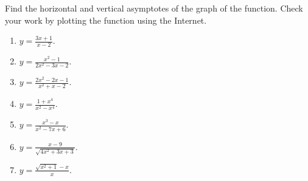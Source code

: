 Find the horizontal and vertical asymptotes of the graph of the function. Check your work by plotting the function using the Internet.
\begin{multicols}{2}
\begin{enumerate}
\item $\displaystyle y=\frac{3x+1}{x-2}$.

\item $\displaystyle y=\frac{x^2-1}{2x^2-3x-2}$.

\item $\displaystyle y=\frac{2x^2-2x-1}{x^2+x-2}$.

\item $\displaystyle y=\frac{1+x^4}{x^2-x^4}$.

\item $\displaystyle y=\frac{x^3-x}{x^2-7x+6}$.

\item $\displaystyle y=\frac{x-9}{\sqrt{4x^2+3x+3}}$.


\item $\displaystyle y=\frac{\sqrt{x^2+1}- x }{x}$.


\end{enumerate}
\end{multicols}